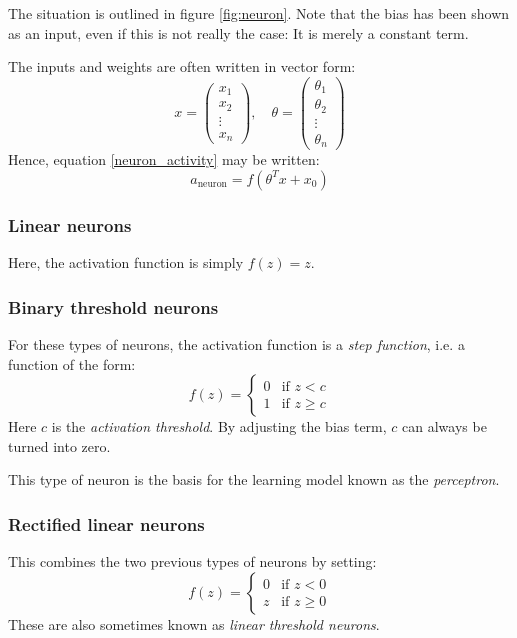 \documentclass[12pt, a4paper]{article}
\numberwithin{equation}{section}
\begin{document}
The situation is outlined in figure \ref{fig:neuron}. Note that the bias has been shown as an input, even if this is not really the case: It is merely a constant term.

The inputs and weights are often written in vector form:
\begin{equation}
x=\begin{pmatrix}
x_1 \\ x_2 \\ \vdots \\ x_n
\end{pmatrix},
\quad
\theta=\begin{pmatrix}
\theta_1 \\ \theta_2 \\ \vdots \\ \theta_n
\end{pmatrix}
\end{equation}
Hence, equation \ref{neuron_activity} may be written:
\begin{equation}
a_\textrm{neuron}=f\left(\theta^T x + x_0\right)
\end{equation}

\subsubsection{Linear neurons}
Here, the activation function is simply $f(z)=z$.

\subsubsection{Binary threshold neurons}
For these types of neurons, the activation function is a \textit{step function}, i.e. a function of the form:
\begin{equation}
f(z)=
\begin{cases}
0 & \textrm{if } z < c \\
1 & \textrm{if } z \ge c
\end{cases}
\end{equation}
Here $c$ is the \textit{activation threshold}. By adjusting the bias term, $c$ can always be turned into zero.

This type of neuron is the basis for the learning model known as the \textit{perceptron}.

\subsubsection{Rectified linear neurons}
This combines the two previous types of neurons by setting:
\begin{equation}
f(z)=
\begin{cases}
0 & \textrm{if } z < 0 \\
z & \textrm{if } z \ge 0
\end{cases}
\end{equation}
These are also sometimes known as \textit{linear threshold neurons}.
\end{document}
